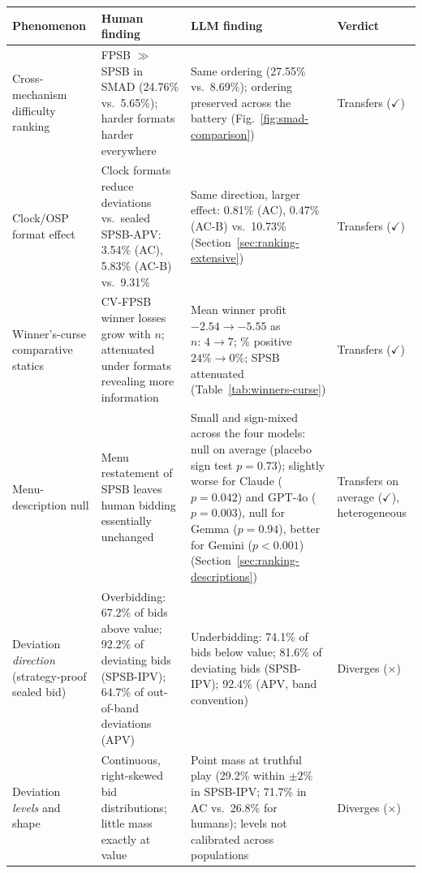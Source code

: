 \begin{table}[!htbp]
\centering
\small
\begin{tabularx}{\textwidth}{>{\raggedright\arraybackslash}p{2.55cm} >{\raggedright\arraybackslash}X >{\raggedright\arraybackslash}X >{\raggedright\arraybackslash}p{1.75cm}}
\toprule
\textbf{Phenomenon} & \textbf{Human finding} & \textbf{LLM finding} & \textbf{Verdict} \\
\midrule
Cross-mechanism difficulty ranking & FPSB $\gg$ SPSB in SMAD (24.76\% vs.\ 5.65\%); harder formats harder everywhere & Same ordering (27.55\% vs.\ 8.69\%); ordering preserved across the battery (Fig.~\ref{fig:smad-comparison}) & Transfers ($\checkmark$) \\
\addlinespace
Clock/OSP format effect & Clock formats reduce deviations vs.\ sealed SPSB-APV: 3.54\% (AC), 5.83\% (AC-B) vs.\ 9.31\% \citep{li2017obviously,breitmoser2022obviousness} & Same direction, larger effect: 0.81\% (AC), 0.47\% (AC-B) vs.\ 10.73\% (Section~\ref{sec:ranking-extensive}) & Transfers ($\checkmark$) \\
\addlinespace
Winner's-curse comparative statics & CV-FPSB winner losses grow with $n$; attenuated under formats revealing more information \citep{kagel1986winner,levin1996revenue} & Mean winner profit $-2.54 \to -5.55$ as $n{:}\,4 \to 7$; \% positive $24\% \to 0\%$; SPSB attenuated (Table~\ref{tab:winners-curse}) & Transfers ($\checkmark$) \\
\addlinespace
Menu-description null & Menu restatement of SPSB leaves human bidding essentially unchanged \citep{gonczarowski2023strategyproofness} & Small and sign-mixed across the four models: null on average (placebo sign test $p=0.73$); slightly worse for Claude ($p=0.042$) and GPT-4o ($p=0.003$), null for Gemma ($p=0.94$), better for Gemini ($p<0.001$) (Section~\ref{sec:ranking-descriptions}) & Transfers on average ($\checkmark$), heterogeneous \\
\addlinespace
Deviation \emph{direction} (strategy-proof sealed bid) & Overbidding: 67.2\% of bids above value; 92.2\% of deviating bids (SPSB-IPV); 64.7\% of out-of-band deviations (APV) & Underbidding: 74.1\% of bids below value; 81.6\% of deviating bids (SPSB-IPV); 92.4\% (APV, band convention) & Diverges ($\times$) \\
\addlinespace
Deviation \emph{levels} and shape & Continuous, right-skewed bid distributions; little mass exactly at value & Point mass at truthful play (29.2\% within $\pm2\%$ in SPSB-IPV; 71.7\% in AC vs.\ 26.8\% for humans); levels not calibrated across populations & Diverges ($\times$) \\

\end{tabularx}
\end{table}
